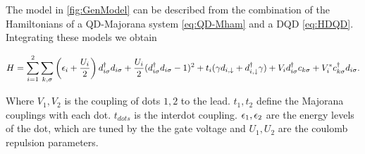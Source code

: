 










 The model in \ref{fig:GenModel} can be described from the combination of the Hamiltonians of a QD-Majorana system \eqref{eq:QD-Mham} and a DQD \eqref{eq:HDQD}. Integrating these models we obtain

\begin{equation}
H =\sum_{i=1}^2\sum_{k,\sigma}\left(\epsilon_{i}+\frac{U_i}{2}\right)d_{i\sigma}^{\dagger}d_{i\sigma}+ \frac{U_i}{2}(d_{i \sigma}^{\dagger}d_{i \sigma}-1)^{2} + t_i(\gamma d_{i,\downarrow}+d^\dagger_{i,\downarrow}\gamma) + V_id^\dagger_{i\sigma}c_{k\sigma}+V_i^* c^\dagger_{k\sigma}d_{i\sigma}.
\label{eq:Generalmodel}
\end{equation}

Where $V_1,V_2$ is the coupling of dots $1,2$ to the lead. $t_1,t_2$ define the Majorana couplings with each dot. $t_{dots}$ is the interdot coupling. $\epsilon_1,\epsilon_2$ are the energy levels of the dot, which are tuned by the the gate voltage and $U_1,U_2$ are the coulomb repulsion parameters. 



